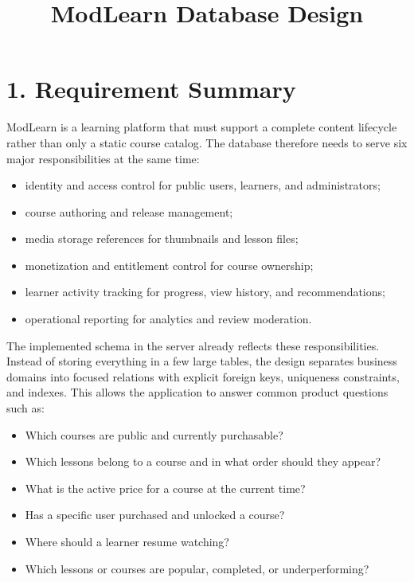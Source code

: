\documentclass[11pt,a4paper]{article}
\title{\textbf{ModLearn Database Design}}
\author{}
\date{}
\begin{document}
\maketitle

\section*{1. Requirement Summary}
ModLearn is a learning platform that must support a complete content lifecycle rather than only a static course catalog. The database therefore needs to serve six major responsibilities at the same time:

\begin{itemize}[leftmargin=1.5em]
	\item identity and access control for public users, learners, and administrators;
	\item course authoring and release management;
	\item media storage references for thumbnails and lesson files;
	\item monetization and entitlement control for course ownership;
	\item learner activity tracking for progress, view history, and recommendations;
	\item operational reporting for analytics and review moderation.
\end{itemize}

The implemented schema in the server already reflects these responsibilities. Instead of storing everything in a few large tables, the design separates business domains into focused relations with explicit foreign keys, uniqueness constraints, and indexes. This allows the application to answer common product questions such as:

\begin{itemize}[leftmargin=1.5em]
	\item Which courses are public and currently purchasable?
	\item Which lessons belong to a course and in what order should they appear?
	\item What is the active price for a course at the current time?
	\item Has a specific user purchased and unlocked a course?
	\item Where should a learner resume watching?
	\item Which lessons or courses are popular, completed, or underperforming?
\end{itemize}
\end{document}
